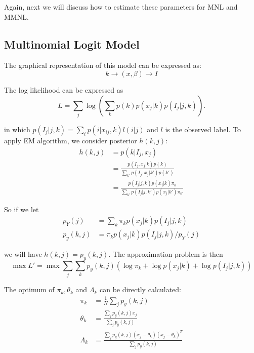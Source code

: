 \documentclass[english]{article}
\begin{document}
Again, next we will discuss how to estimate these parameters for MNL and MMNL.

\subsection{Multinomial Logit Model}

The graphical representation of this model can be expressed as:
\begin{equation}\nonumber
  k \to (x,\beta) \to I
\end{equation}

The log likelihood can be expressed as
\begin{equation}\nonumber
  L = \sum_j\log(\sum_kp(k)p(x_j|k)p(I_j|j,k)).
\end{equation}

\noindent in which $p(I_j|j,k) = \sum_ip(i|x_{ij},k)l(i|j)$ and $l$ is the observed label. To apply EM algorithm, we consider posterior $h(k,j)$:
\begin{equation}\nonumber
  \begin{aligned}
    h(k,j) & = p(k|I_j,x_j)\\
    & = \frac{p(I_j,x_j|k)p(k)}{\sum_{k'}p(I_j,x_j|k')p(k')}\\
    & = \frac{p(I_j|j,k)p(x_j|k)\pi_k}{\sum_{k'}p(I_j|j,k')p(x_j|k')\pi_{k'}}
  \end{aligned}
\end{equation}

So if we let
\begin{equation}\nonumber
  \begin{aligned}
    p_Y(j) & = \sum_k \pi_kp(x_j|k)p(I_j|j,k)\\
    p_y(k,j) & = \pi_kp(x_j|k)p(I_j|j,k)/p_Y(j)
  \end{aligned}
\end{equation}

\noindent we will have $h(k,j)=p_y(k,j)$. The approximation problem is then
\begin{equation}
  \max L' = \max \sum_j\sum_k p_y(k,j)(\log\pi_k+\log p(x_j|k)+\log p(I_j|j,k))
\end{equation}

The optimum of $\pi_k,\theta_k$ and $\Lambda_k$ can be directly calculated:
\begin{equation}\nonumber
  \begin{aligned}
    \pi_k & = \frac{1}{N}\sum_j p_y(k,j) \\
    \theta_k & = \frac{\sum_j p_y(k,j)x_j}{\sum_j p_y(k,j)}\\
    \Lambda_k & = \frac{\sum_j p_y(k,j)(x_j-\theta_k)(x_j-\theta_k)^T}{\sum_j p_y(k,j)}
  \end{aligned}
\end{equation}
\end{document}
